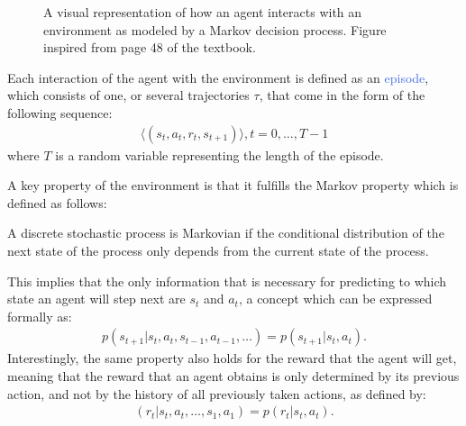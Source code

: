 \begin{figure}[htb!]
	\centering
	
\caption{A visual representation of how an agent interacts with an environment as modeled by a Markov decision process. Figure inspired from page 48 of the \citet{sutton2018reinforcement} textbook.}
  \label{fig:rl_loop}
\end{figure}

Each interaction of the agent with the environment is defined as an \textcolor{RoyalBlue}{episode}, which consists of one, or several trajectories $\tau$, that come in the form of the following sequence:
\begin{align}
	\langle(s_t,a_t,r_t,s_{t+1})\rangle,t=0,\ldots,T-1
\end{align}
where $T$ is a random variable representing the length of the episode.

A key property of the environment is that it fulfills the Markov property which is defined as follows:
\begin{definition}
	A discrete stochastic process is Markovian if the conditional distribution of the next state of the process only depends from the current state of the process.
\end{definition}
This implies that the only information that is necessary for predicting to which state an agent will step next are $s_t$ and $a_t$, a concept which can be expressed formally as:
\begin{align}
	p(s_{t+1}|s_t, a_t, s_{t-1}, a_{t-1}, \ldots) = p(s_{t+1} | s_t, a_t).
\end{align}
Interestingly, the same property also holds for the reward that the agent will get, meaning that the reward that an agent obtains is only determined by its previous action, and not by the history of all previously taken actions, as defined by:
\begin{align}
	(r_t| s_t, a_t, \ldots, s_1, a_1) = p(r_t|s_t,a_t).
\end{align}


